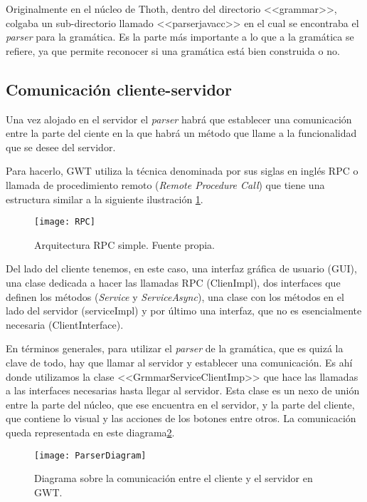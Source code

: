 Originalmente en el núcleo de Thoth, dentro del directorio <<grammar>>, colgaba un sub-directorio llamado <<parserjavacc>> en el cual se encontraba el \emph{parser} para la gramática. Es la parte más importante a lo que a la gramática se refiere, ya que permite reconocer si una gramática está bien construida o no.


\subsection{Comunicación cliente-servidor}
Una vez alojado en el servidor el \emph{parser} habrá que establecer una comunicación entre la parte del ciente en la que habrá un método que llame a la funcionalidad que se desee del servidor.

Para hacerlo, GWT utiliza la técnica denominada por sus siglas en inglés RPC o llamada de procedimiento remoto (\emph{Remote Procedure Call}) que tiene una estructura similar a la siguiente ilustración \ref{fig:5.1}.

\begin{figure}[h]
\centering
\texttt{[image: RPC]}
\caption{Arquitectura RPC simple. Fuente propia.}
\label{fig:5.1}
\end{figure}

Del lado del cliente tenemos, en este caso, una interfaz gráfica de usuario (GUI), una clase dedicada a hacer las llamadas RPC (ClienImpl), dos interfaces que definen los métodos (\emph{Service} y \emph{ServiceAsync}), una clase con los métodos en el lado del servidor (serviceImpl) y por último una interfaz, que no es esencialmente necesaria (ClientInterface). 

En términos generales, para utilizar el \emph{parser} de la gramática, que es quizá la clave de todo, hay que llamar al servidor y establecer una comunicación. Es ahí donde utilizamos la clase <<GrmmarServiceClientImp>> que hace las llamadas a las interfaces necesarias hasta llegar al servidor. Esta clase es un nexo de unión entre la parte del núcleo, que ese encuentra en el servidor, y la parte del cliente, que contiene lo visual y las acciones de los botones entre otros. La comunicación queda representada en este diagrama\ref{fig:5.2}.

\begin{figure}[h]
\centering
\texttt{[image: ParserDiagram]}
\caption{Diagrama sobre la comunicación entre el cliente y el servidor en GWT.}
\label{fig:5.2}
\end{figure}

